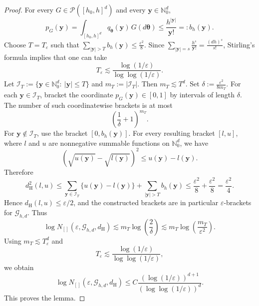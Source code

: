 \documentclass[twoside,12pt]{article}
\begin{document}
\begin{proof}
For every $G\in\mathcal P([h_{0},h]^d)$ and every $\boldsymbol y\in\mathbb N_0^d$,
\begin{displaymath}
p_G(\boldsymbol y)=\int_{[h_{0},h]^d}q_{\boldsymbol\theta}(\boldsymbol y)\,G(d\boldsymbol\theta)\le\frac{h^{|\boldsymbol y|}}{\boldsymbol y!}=:b_h(\boldsymbol y).
\end{displaymath}
Choose $T=T_\varepsilon$ such that $\sum_{|\boldsymbol y|>T} b_h(\boldsymbol y)\le\frac{\varepsilon^2}{8}$.  Since $\sum_{|\boldsymbol y|=s}\frac{h^s}{\boldsymbol y!}
=\frac{(dh)^s}{s!}$, Stirling's formula implies that one can take
\begin{displaymath}
T_\varepsilon\lesssim\frac{\log(1/\varepsilon)}{\log\log(1/\varepsilon)}.
\end{displaymath}
Let $\mathcal I_T:=\{\boldsymbol y\in\mathbb N_0^d:\ |\boldsymbol y|\le T\}$ and $m_T:=|\mathcal I_T|$. Then $m_T\lesssim T^d$. Set $\delta:=\frac{\varepsilon^2}{8m_T}$. For each $\boldsymbol y\in\mathcal I_T$, bracket the coordinate
$p_G(\boldsymbol y)\in[0,1]$ by intervals of length $\delta$. The number of such coordinatewise
brackets is at most
\begin{displaymath}
\left(\frac{1}{\delta}+1\right)^{m_T}.
\end{displaymath}
For $\boldsymbol y\notin\mathcal I_T$, use the bracket $[0,b_h(\boldsymbol y)]$. For every resulting bracket $[l,u]$, where $l$ and $u$ are nonnegative summable functions on $\mathbb N_0^d$, we have
\begin{displaymath}
(\sqrt{u(\boldsymbol y)}-\sqrt{l(\boldsymbol y)})^2\le u(\boldsymbol y)-l(\boldsymbol y).
\end{displaymath}
Therefore
\begin{displaymath}
d_{\mathrm H}^2(l,u)\le\sum_{\boldsymbol y\in\mathcal I_T}\{u(\boldsymbol y)-l(\boldsymbol y)\}+\sum_{|\boldsymbol y|>T}b_h(\boldsymbol y)\le\frac{\varepsilon^2}{8}+\frac{\varepsilon^2}{8}=\frac{\varepsilon^2}{4}.
\end{displaymath}
Hence $d_{\mathrm H}(l,u)\le\varepsilon/2$, and the constructed brackets are in particular $\varepsilon$-brackets for $\mathcal G_{h,d}$. Thus
\begin{displaymath}
\log N_{[]}(\varepsilon,\mathcal G_{h,d},d_{\mathrm H})\lesssim m_T\log\left(\frac{2}{\delta}\right)\lesssim m_T\log\left(\frac{m_T}{\varepsilon^2}\right).
\end{displaymath}
Using $m_T\lesssim T_\varepsilon^d$ and
\begin{displaymath}
T_\varepsilon\lesssim\frac{\log(1/\varepsilon)}{\log\log(1/\varepsilon)},
\end{displaymath}
we obtain
\begin{displaymath}
\log N_{[]}(\varepsilon,\mathcal G_{h,d},d_{\mathrm H})\le C\frac{(\log(1/\varepsilon))^{d+1}}{(\log\log(1/\varepsilon))^d}.
\end{displaymath}
This proves the lemma.
\end{proof}
\end{document}
